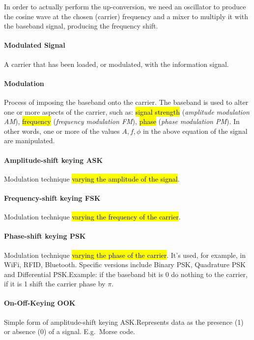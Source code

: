 In order to actually perform the up-conversion, we need an oscillator to
produce the cosine wave at the chosen (carrier) frequency and a mixer to
multiply it with the baseband signal, producing the frequency shift.

\paragraph{Modulated Signal}
A carrier that has been loaded, or modulated, with the information signal.

\paragraph{Modulation}
Process of imposing the baseband onto the carrier. The baseband is used to
alter one or more aspects of the carrier, such as: \hl{signal strength} (\textit{amplitude
	modulation AM}), \hl{frequency} (\textit{frequency modulation FM}), \hl{phase}
(\textit{phase modulation PM}). In other words, one or more of the values $A, f, \phi$
in the above equation of the signal are manipulated.

\paragraph{Amplitude-shift keying ASK}
Modulation technique \hl{varying the amplitude of the signal}.

\paragraph{Frequency-shift keying FSK}
Modulation technique \hl{varying the frequency of the carrier}.

\paragraph{Phase-shift keying PSK}
Modulation technique \hl{varying the phase of the carrier}. It's used, for example,
in WiFi, RFID, Bluetooth. Specific versions include Binary PSK, Quadrature PSK
and Differential PSK.\@ Example: if the baseband bit is 0 do nothing to the
carrier, if it is 1 shift the carrier phase by $\pi$.

\paragraph{On-Off-Keying OOK}
Simple form of amplitude-shift keying ASK.\@ Represents data as the presence
(1) or absence (0) of a signal. E.g.\ Morse code.

